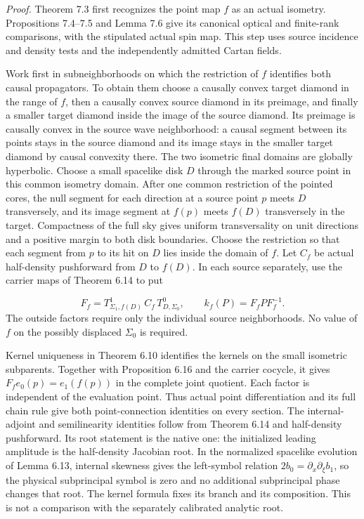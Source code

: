 \documentclass[
  english,
  11pt,
  reqno]{amsart}
\begin{document}
\emph{Proof.} Theorem 7.3 first recognizes the point map \(f\) as an
actual isometry. Propositions 7.4--7.5 and Lemma 7.6 give its canonical
optical and finite-rank comparisons, with the stipulated actual spin
map. This step uses source incidence and density tests and the
independently admitted Cartan fields.

Work first in subneighborhoods on which the restriction of \(f\)
identifies both causal propagators. To obtain them choose a causally
convex target diamond in the range of \(f\), then a causally convex
source diamond in its preimage, and finally a smaller target diamond
inside the image of the source diamond. Its preimage is causally convex
in the source wave neighborhood: a causal segment between its points
stays in the source diamond and its image stays in the smaller target
diamond by causal convexity there. The two isometric final domains are
globally hyperbolic. Choose a small spacelike disk \(D\) through the
marked source point in this common isometry domain. After one common
restriction of the pointed cores, the null segment for each direction at
a source point \(p\) meets \(D\) transversely, and its image segment at
\(f(p)\) meets \(f(D)\) transversely in the target. Compactness of the
full sky gives uniform transversality on unit directions and a positive
margin to both disk boundaries. Choose the restriction so that each
segment from \(p\) to its hit on \(D\) lies inside the domain of \(f\).
Let \(C_f\) be actual half-density pushforward from \(D\) to \(f(D)\).
In each source separately, use the carrier maps of Theorem 6.14 to put

\label{eq:online-full-source-displaced-carrier-lift} \[
F_f=T^1_{\Sigma_1,f(D)}\,C_f\,T^0_{D,\Sigma_0},
\qquad k_f(P)=F_fPF_f^{-1}.
\] The outside factors require only the individual source neighborhoods.
No value of \(f\) on the possibly displaced \(\Sigma_0\) is required.

Kernel uniqueness in Theorem 6.10 identifies the kernels on the small
isometric subparents. Together with Proposition 6.16 and the carrier
cocycle, it gives \(F_fe_0(p)=e_1(f(p))\) in the complete joint
quotient. Each factor is independent of the evaluation point. Thus
actual point differentiation and its full chain rule give both
point-connection identities on every section. The internal-adjoint and
semilinearity identities follow from Theorem 6.14 and half-density
pushforward. Its root statement is the native one: the initialized
leading amplitude is the half-density Jacobian root. In the normalized
spacelike evolution of Lemma 6.13, internal skewness gives the
left-symbol relation \(2b_0=\partial_x\partial_\xi b_1\), so the
physical subprincipal symbol is zero and no additional subprincipal
phase changes that root. The kernel formula fixes its branch and its
composition. This is not a comparison with the separately calibrated
analytic root.
\end{document}
